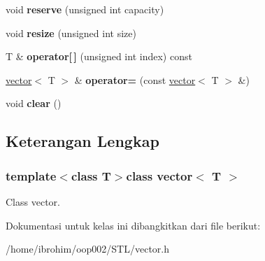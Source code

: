 \begin{DoxyCompactItemize}
\item 
\hypertarget{classvector_ae37ac6075980a3113fc442ce4411204c}{}void {\bfseries reserve} (unsigned int capacity)\label{classvector_ae37ac6075980a3113fc442ce4411204c}

\item 
\hypertarget{classvector_a313d7dd651ab48eeddf7845cbd5bc5af}{}void {\bfseries resize} (unsigned int size)\label{classvector_a313d7dd651ab48eeddf7845cbd5bc5af}

\item 
\hypertarget{classvector_ab6ebd10d627f8eb33e15c27cf7aaf36a}{}T \& {\bfseries operator\mbox{[}$\,$\mbox{]}} (unsigned int index) const \label{classvector_ab6ebd10d627f8eb33e15c27cf7aaf36a}

\item 
\hypertarget{classvector_ad88d3a7709894cdb0b471db0a7a8eb6f}{}\hyperlink{classvector}{vector}$<$ T $>$ \& {\bfseries operator=} (const \hyperlink{classvector}{vector}$<$ T $>$ \&)\label{classvector_ad88d3a7709894cdb0b471db0a7a8eb6f}

\item 
\hypertarget{classvector_a1a91cd18e54c382af1097d630405398f}{}void {\bfseries clear} ()\label{classvector_a1a91cd18e54c382af1097d630405398f}

\end{DoxyCompactItemize}


\subsection{Keterangan Lengkap}
\subsubsection*{template$<$class T$>$class vector$<$ T $>$}

Class vector. 

Dokumentasi untuk kelas ini dibangkitkan dari file berikut\+:\begin{DoxyCompactItemize}
\item 
/home/ibrohim/oop002/\+S\+T\+L/vector.\+h\end{DoxyCompactItemize}
